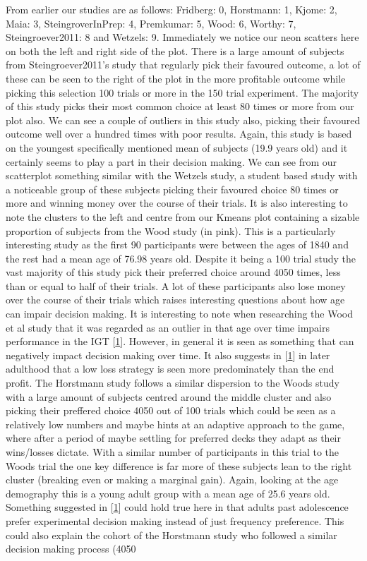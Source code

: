\documentclass[letterpaper,10pt,english]{jupyterBook}
\begin{document}
\sphinxAtStartPar
From earlier our studies are as follows: Fridberg: 0, Horstmann: 1, Kjome: 2, Maia: 3, SteingroverInPrep: 4, Premkumar: 5, Wood: 6, Worthy: 7, Steingroever2011: 8 and Wetzels: 9. Immediately we notice our neon scatters here on both the left and right side of the plot. There is a large amount of subjects from Steingroever2011’s study that regularly pick their favoured outcome, a lot of these can be seen to the right of the plot in the more profitable outcome while picking this selection 100 trials or more in the 150 trial experiment. The majority of this study picks their most common choice at least 80 times or more from our plot also. We can see a couple of outliers in this study also, picking their favoured outcome well over a hundred times with poor results. Again, this study is based on the youngest specifically mentioned mean of subjects (19.9 years old) and it certainly seems to play a part in their decision making. We can see from our scatterplot something similar with the Wetzels study, a student based study with a noticeable group of these subjects picking their favoured choice 80 times or more and winning money over the course of their trials. It is also interesting to note the clusters to the left and centre from our K\sphinxhyphen{}means plot containing a sizable proportion of subjects from the Wood study (in pink). This is a particularly interesting study as the first 90 participants were between the ages of 18\sphinxhyphen{}40 and the rest had a mean age of 76.98 years old. Despite it being a 100 trial study the vast majority of this study pick their preferred choice around 40\sphinxhyphen{}50 times, less than or equal to half of their trials. A lot of these participants also lose money over the course of their trials which raises interesting questions about how age can impair decision making. It is interesting to note when researching the Wood et al study that it was regarded as an outlier in that age over time impairs performance in the IGT {[}\hyperlink{cite.zbibliography:id2}{1}{]}. However, in general it is seen as something that can negatively impact decision making over time. It also suggests in {[}\hyperlink{cite.zbibliography:id2}{1}{]} in later adulthood that a low loss strategy is seen more predominately than the end profit. The Horstmann study follows a similar dispersion to the Woods study with a large amount of subjects centred around the middle cluster and also picking their preffered choice 40\sphinxhyphen{}50 out of 100 trials which could be seen as a relatively low numbers and maybe hints at an adaptive approach to the game, where after a period of maybe settling for preferred decks they adapt as their wins/losses dictate. With a similar number of participants in this trial to the Woods trial the one key difference is far more of these subjects lean to the right cluster (breaking even or making a marginal gain). Again, looking at the age demography this is a young adult group with a mean age of 25.6 years old. Something suggested in {[}\hyperlink{cite.zbibliography:id2}{1}{]} could hold true here in that adults past adolescence prefer experimental decision making instead of just frequency preference. This could also explain the cohort of the Horstmann study who followed a similar decision making process (40\sphinxhyphen{}50 
\end{document}

